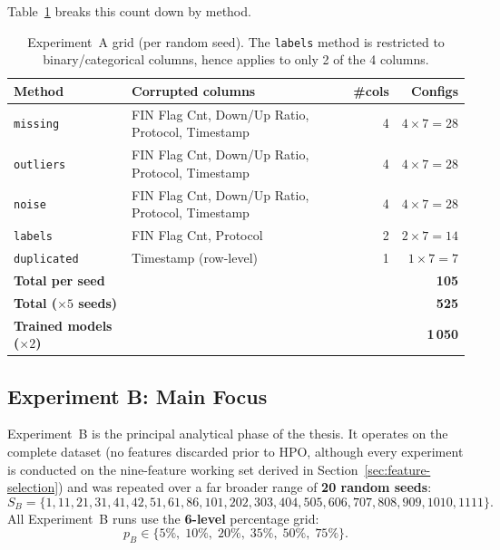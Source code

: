 \documentclass[../main.tex]{subfiles}
\begin{document}
Table~\ref{tab:grid-A} breaks this count down by method.

\begin{table}[H]
\centering
\caption{Experiment~A grid (per random seed). The \texttt{labels} method is restricted to binary/categorical columns, hence applies to only 2 of the 4 columns.}
\label{tab:grid-A}
\small
\begin{tabular}{llrr}
\toprule
\textbf{Method}    & \textbf{Corrupted columns}                       & \textbf{\#cols} & \textbf{Configs} \\
\midrule
\texttt{missing}   & FIN Flag Cnt, Down/Up Ratio, Protocol, Timestamp & 4               & $4 \times 7 = 28$ \\
\texttt{outliers}  & FIN Flag Cnt, Down/Up Ratio, Protocol, Timestamp & 4               & $4 \times 7 = 28$ \\
\texttt{noise}     & FIN Flag Cnt, Down/Up Ratio, Protocol, Timestamp & 4               & $4 \times 7 = 28$ \\
\texttt{labels}    & FIN Flag Cnt, Protocol                           & 2               & $2 \times 7 = 14$ \\
\texttt{duplicated}& Timestamp (row-level)                            & 1               & $1 \times 7 = 7$  \\
\midrule
\textbf{Total per seed} &                                             &                 & \textbf{105} \\
\textbf{Total ($\times 5$ seeds)} &                                   &                 & \textbf{525} \\
\textbf{Trained models ($\times 2$)} &                                &                 & \textbf{1\,050} \\
\bottomrule
\end{tabular}
\end{table}

\subsection{Experiment B: Main Focus}
\label{sec:exp-B-grid}

Experiment~B is the principal analytical phase of the thesis.  It operates on the complete dataset (no features discarded prior to HPO, although every experiment is conducted on the nine-feature working set derived in Section~\ref{sec:feature-selection}) and was repeated over a far broader range of \textbf{20 random seeds}:
\[
    S_{B} = \{1, 11, 21, 31, 41, 42, 51, 61, 86, 101, 202, 303, 404, 505, 606, 707, 808, 909, 1010, 1111\}.
\]
All Experiment~B runs use the \textbf{6-level} percentage grid:
\[
    p_{B} \in \{5\%,\; 10\%,\; 20\%,\; 35\%,\; 50\%,\; 75\%\}.
\]
\end{document}
